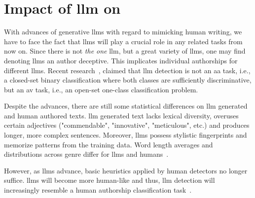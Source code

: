 \section{Impact of \acs{llm} on \ai{}}

With advances of generative \acp{llm} with regard to mimicking human writing, we have to face the fact that \acp{llm} will play a crucial role in any \ai{} related tasks from now on.
Since there is not \textit{the one} \ac{llm}, but a great variety of \acp{llm}, one may find denoting \acp{llm} an author deceptive.
This implicates individual authorships for different \acp{llm}.
Recent research~\citep{llm_detection_av_2025}, claimed that \ac{llm} detection is not an \ac{aa} task, i.e., a closed-set binary classification where both classes are sufficiently discriminative, but an \ac{av} task, i.e., an open-set one-class classification problem. 

Despite the advances, there are still some statistical differences on \ac{llm} generated and human authored texts.
\ac{llm} generated text lacks lexical diversity, overuses certain adjectives ("commendable", "innovative", "meticulous", etc.) and produces longer, more complex sentences.
Moreover, \acp{llm} possess stylistic fingerprints and memorize patterns from the training data.
Word length averages and distributions across genre differ for \acp{llm} and humans~\citep{llm_detection_av_2025}.

However, as \acp{llm} advance, basic heuristics applied by human detectors no longer suffice.
\acp{llm} will become more human-like and thus, \ac{llm} detection will increasingly resemble a human authorship classification task~\citep{llm_detection_av_2025}.
